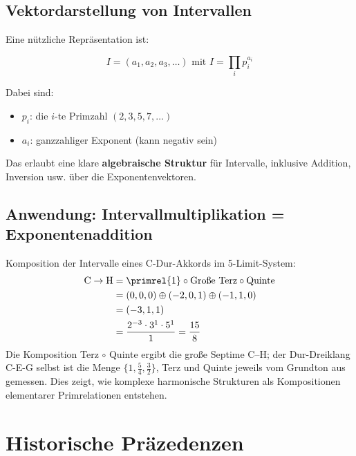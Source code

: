 	\subsection{Vektordarstellung von Intervallen}
	
	Eine nützliche Repräsentation ist:
	
	\begin{definition}
		\begin{equation}
			I = (a_1, a_2, a_3, \ldots) \text{ mit } I = \prod_{i} p_i^{a_i}
		\end{equation}
		
		Dabei sind:
		\begin{itemize}
			\item $p_i$: die $i$-te Primzahl $(2, 3, 5, 7, \ldots)$
			\item $a_i$: ganzzahliger Exponent (kann negativ sein)
		\end{itemize}
	\end{definition}
	
	Das erlaubt eine klare \textbf{algebraische Struktur} für Intervalle, inklusive Addition, Inversion usw. über die Exponentenvektoren.
	
	\subsection{Anwendung: Intervallmultiplikation = Exponentenaddition}
	
	\begin{example}
		Komposition der Intervalle eines C-Dur-Akkords im 5-Limit-System:
		\begin{align}
			\text{C}\to\text{H} &= \primrel{1} \circ \text{Große Terz} \circ \text{Quinte} \\
			&= (0,0,0) \oplus (-2,0,1) \oplus (-1,1,0) \\
			&= (-3,1,1) \\
			&= \frac{2^{-3} \cdot 3^1 \cdot 5^1}{1} = \frac{15}{8}
		\end{align}
		Die Komposition Terz $\circ$ Quinte ergibt die große Septime C--H; der Dur-Dreiklang C-E-G selbst ist die Menge $\{1, \tfrac54, \tfrac32\}$, Terz und Quinte jeweils vom Grundton aus gemessen.
		Dies zeigt, wie komplexe harmonische Strukturen als Kompositionen elementarer Primrelationen entstehen.
	\end{example}
	
	\section{Historische Präzedenzen}
	
